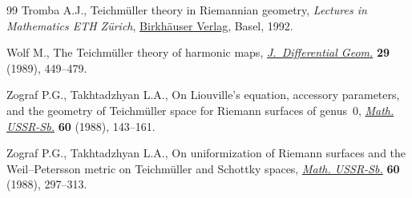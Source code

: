 \documentclass[pdftex]{sigma}%
\numberwithin{equation}{section}
\begin{document}
\begin{thebibliography}{99}
Tromba A.J., Teichm\"uller theory in {R}iemannian geometry, \textit{Lectures in
 Mathematics ETH Z\"urich}, \href{https://doi.org/10.1007/978-3-0348-8613-0}{Birkh\"auser Verlag}, Basel, 1992.

Wolf M., The {T}eichm\"uller theory of harmonic maps, \href{https://doi.org/10.4310/jdg/1214442885}{\textit{J.~Differential
 Geom.}} \textbf{29} (1989), 449--479.

Zograf P.G., Takhtadzhyan L.A., On {L}iouville's equation, accessory parameters, and the geometry of {T}eich\-m\"uller space for {R}iemann surfaces of genus~$0$, \href{https://doi.org/10.1070/SM1988v060n01ABEH003160}{\textit{Math. USSR-Sb.}} \textbf{60} (1988), 143--161.

Zograf P.G., Takhtadzhyan L.A., On uniformization of {R}iemann surfaces and the {W}eil--{P}etersson metric on {T}eichm\"uller and {S}chottky spaces, \href{https://doi.org/10.1070/SM1988v060n02ABEH003170}{\textit{Math. USSR-Sb.}} \textbf{60} (1988), 297--313.

\end{thebibliography}\LastPageEnding
\end{document}
